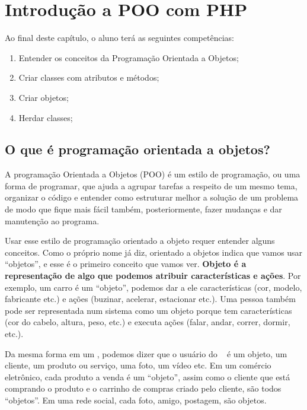 \chapter{Introdução a POO com PHP}
\label{introducao-poo-php}

Ao final deste capítulo, o aluno terá as seguintes competências:
\begin{enumerate}
    \item Entender os conceitos da Programação Orientada a Objetos;
    \item Criar classes com atributos e métodos;
    \item Criar objetos;
    \item Herdar classes;
\end{enumerate}

\section{O que é programação orientada a objetos?}
\label{o-que-eh-poo}

A programação Orientada a Objetos (POO) é um estilo de programação, ou uma forma de programar, 
que ajuda a agrupar tarefas a respeito de um mesmo tema, organizar o código e entender como 
estruturar melhor a solução de um problema de modo que fique mais fácil também, posteriormente, 
fazer mudanças e dar manutenção ao programa. 

Usar esse estilo de programação orientado a objeto requer entender alguns conceitos. Como o 
próprio nome já diz, orientado a objetos indica que vamos usar ``objetos'', e esse é o primeiro 
conceito que vamos ver. \textbf{Objeto é a representação de algo que podemos atribuir características 
e ações}. Por exemplo, um carro é um ``objeto'', podemos dar a ele características (cor, modelo, 
fabricante etc.) e ações (buzinar, acelerar, estacionar etc.). Uma pessoa também pode ser 
representada num sistema como um objeto porque tem características (cor do cabelo, altura, 
peso, etc.) e executa ações (falar, andar, correr, dormir, etc.). 

Da mesma forma em um \site, podemos dizer que o usuário do \site~ é um objeto, um cliente, um 
produto ou serviço, uma foto, um vídeo etc. Em um comércio eletrônico, cada produto a venda 
é um ``objeto'', assim como o cliente que está comprando o produto e o carrinho de compras 
criado pelo cliente, são todos ``objetos''. Em uma rede social, cada foto, amigo, postagem, 
são objetos. 

